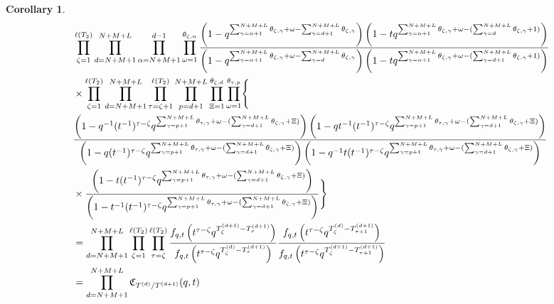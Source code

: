\documentclass[12pt,reqno,a4paper]{amsart}
\newcommand{\fraks}[1]{\mathfrak{#1}}
\numberwithin{equation}{section}
\newtheorem{cor}[thm]{Corollary}
\theoremstyle{definition}
\begin{document}
\begin{cor}\mbox{}
\label{cor4-17aug-1339-sun}
\footnotesize
\begin{align}
&\prod_{\zeta = 1}^{\ell(T_2)}
\prod_{d = N+M+1}^{N+M+L}
\prod_{\alpha = N+M+1}^{d - 1} 
\prod_{\omega = 1}^{\theta_{\zeta,\alpha}}
\frac{
	\left(	1 - q^{	\sum_{\gamma = \alpha + 1}^{N + M + L} \theta_{\zeta,\gamma}	+ \omega - \sum_{\gamma = d+1}^{N + M + L}\theta_{\zeta,\gamma} 		}			\right)
	\left(	1 - tq^{	\sum_{\gamma = \alpha + 1}^{N + M + L} \theta_{\zeta,\gamma}	+ \omega - (\sum_{\gamma = d}^{N + M + L}\theta_{\zeta,\gamma} 	+ 1 )	}		\right)
}{
	\left(	1 - q^{	\sum_{\gamma = \alpha + 1}^{N + M + L} \theta_{\zeta,\gamma}	+ \omega - \sum_{\gamma = d}^{N + M + L}\theta_{\zeta,\gamma} 		}			\right)
	\left(	1 - 	tq^{	\sum_{\gamma = \alpha + 1}^{N + M + L} \theta_{\zeta,\gamma}	+ \omega - (\sum_{\gamma = d + 1}^{N + M + L}\theta_{\zeta,\gamma} 	+ 1 )	}			\right)
}
\notag 
\\
&\times
\prod_{\zeta = 1}^{\ell(T_2)}
\prod_{d = N+M+1}^{N+M+L}
\prod_{\tau = \zeta + 1}^{\ell(T_2)}
\prod_{p = d+1}^{N+M+L}
\prod_{\Xi = 1}^{\theta_{\zeta,d}}
\prod_{\omega = 1}^{\theta_{\tau,p}}
\Biggl\{
\notag 
\\
&\frac{
	\left(	1 - q^{-1}					
	(t^{-1})^{\tau - \zeta} q^{	\sum_{\gamma = p + 1}^{N + M + L} \theta_{\tau,\gamma}	+ \omega	- (\sum_{\gamma = d + 1}^{N + M + L} \theta_{\zeta,\gamma} + \Xi)		}	
	\right)
	\left(	1 - qt^{-1}			
	(t^{-1})^{\tau - \zeta} q^{	\sum_{\gamma = p + 1}^{N + M + L} \theta_{\tau,\gamma}	+ \omega	- (\sum_{\gamma = d + 1}^{N + M + L} \theta_{\zeta,\gamma} + \Xi)		}
	\right)
}{
	\left(	1 - q			
	(t^{-1})^{\tau - \zeta} q^{	\sum_{\gamma = p + 1}^{N + M + L} \theta_{\tau,\gamma}	+ \omega	- (\sum_{\gamma = d + 1}^{N + M + L} \theta_{\zeta,\gamma} + \Xi)		}
	\right)
	\left(	1 - q^{-1}t			
	(t^{-1})^{\tau - \zeta} q^{	\sum_{\gamma = p + 1}^{N + M + L} \theta_{\tau,\gamma}	+ \omega	- (\sum_{\gamma = d + 1}^{N + M + L} \theta_{\zeta,\gamma} + \Xi)		}
	\right)
}
\notag 
\\
&\times
\frac{
	\left(	1 - t		
	(t^{-1})^{\tau - \zeta} q^{	\sum_{\gamma = p + 1}^{N + M + L} \theta_{\tau,\gamma}	+ \omega	- (\sum_{\gamma = d + 1}^{N + M + L} \theta_{\zeta,\gamma} + \Xi)		}
	\right)
}{
	\left(	1 - t^{-1}			
	(t^{-1})^{\tau - \zeta} q^{	\sum_{\gamma = p + 1}^{N + M + L} \theta_{\tau,\gamma}	+ \omega	- (\sum_{\gamma = d + 1}^{N + M + L} \theta_{\zeta,\gamma} + \Xi)		}
	\right)
}
\Biggr\}
\label{eqna7-1343-17aug-sun}
\\
&= 
\prod_{d = N+M+1}^{N+M+L}
\prod_{\zeta = 1}^{\ell(T_2)}
\prod_{\tau = \zeta}^{\ell(T_2)}
\frac{
	f_{q,t}\left(	t^{\tau - \zeta} q^{ T^{(d+1)}_{\zeta} 	- T^{(d+1)}_{\tau}	 		}						\right)
}{
	f_{q,t}\left(	t^{\tau - \zeta} q^{ T^{(d)}_{\zeta} 	- T^{(d+1)}_{\tau}		}						\right)
}
\frac{
	f_{q,t}\left(		
	t^{\tau - \zeta} q^{ T^{(d)}_{\zeta} 	- T^{(d+1)}_{\tau + 1} 		}					\right)
}{
	f_{q,t}\left(		
	t^{\tau- \zeta} q^{ T^{(d+1)}_{\zeta} 	- T^{(d+1)}_{\tau + 1}			}					\right)
}
\label{eqn-a7-1329-17aug}
\\
&= \prod_{d = N+M+1}^{N+M+L}\fraks{C}_{T^{(d)}/T^{(d+1)}}(q,t)
\end{align}
\normalsize
\end{cor}
\end{document}
